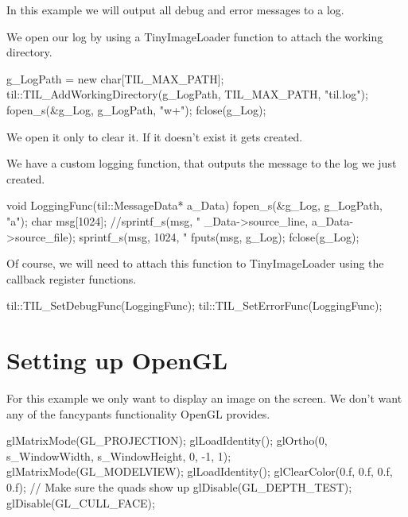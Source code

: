 In this example we will output all debug and error messages to a log.

We open our log by using a TinyImageLoader function to attach the working directory. 
\begin{DoxyCode}
        g_LogPath = new char[TIL_MAX_PATH];
        til::TIL_AddWorkingDirectory(g_LogPath, TIL_MAX_PATH, "til.log");
        fopen_s(&g_Log, g_LogPath, "w+");
        fclose(g_Log);
\end{DoxyCode}


We open it only to clear it. If it doesn't exist it gets created.

We have a custom logging function, that outputs the message to the log we just created.


\begin{DoxyCode}
        void LoggingFunc(til::MessageData* a_Data)
        {
                fopen_s(&g_Log, g_LogPath, "a");
                char msg[1024];
                //sprintf_s(msg, "%
      _Data->source_line, a_Data->source_file);
                sprintf_s(msg, 1024, "%
                fputs(msg, g_Log);
                fclose(g_Log);
        }
\end{DoxyCode}


Of course, we will need to attach this function to TinyImageLoader using the callback register functions.


\begin{DoxyCode}
        til::TIL_SetDebugFunc(LoggingFunc);
        til::TIL_SetErrorFunc(LoggingFunc);
\end{DoxyCode}
\hypertarget{example1_setupopengl}{}\section{Setting up OpenGL}\label{example1_setupopengl}
For this example we only want to display an image on the screen. We don't want any of the fancypants functionality OpenGL provides.


\begin{DoxyCode}
        glMatrixMode(GL_PROJECTION);
                glLoadIdentity();
                glOrtho(0, s_WindowWidth, s_WindowHeight, 0, -1, 1);
        glMatrixMode(GL_MODELVIEW);
                glLoadIdentity();
        glClearColor(0.f, 0.f, 0.f, 0.f);
        // Make sure the quads show up
        glDisable(GL_DEPTH_TEST);
        glDisable(GL_CULL_FACE);
\end{DoxyCode}


